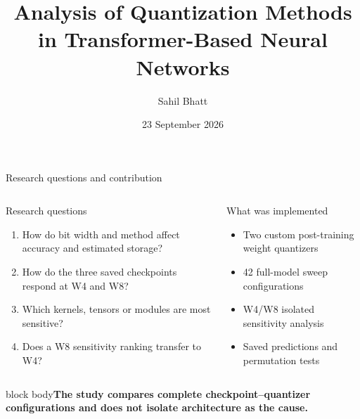 \documentclass[aspectratio=169,10pt]{beamer}
\title[Neural-network quantization]{Analysis of Quantization Methods\\in Transformer-Based Neural Networks}
\author[S. Bhatt]{Sahil Bhatt}
\institute{Technische Universit\"at Ilmenau}
\date{23 September 2026}
\newcommand{\takeaway}[1]{\vfill\begin{beamercolorbox}[wd=\textwidth,sep=1.5mm,rounded=true]{block body}\centering\small\bfseries #1\end{beamercolorbox}}
\begin{document}
\maketitle

\begin{frame}{Research questions and contribution}
\begin{columns}[T,onlytextwidth]
\begin{block}{Research questions}
\small
\begin{enumerate}
  \item How do bit width and method affect accuracy and estimated storage?
  \item How do the three saved checkpoints respond at W4 and W8?
  \item Which kernels, tensors or modules are most sensitive?
  \item Does a W8 sensitivity ranking transfer to W4?
\end{enumerate}
\end{block}
\begin{alertblock}{What was implemented}
\small
\begin{itemize}
  \item Two custom post-training weight quantizers
  \item 42 full-model sweep configurations
  \item W4/W8 isolated sensitivity analysis
  \item Saved predictions and permutation tests
\end{itemize}
\end{alertblock}
\end{columns}
\takeaway{The study compares complete checkpoint--quantizer configurations and does not isolate architecture as the cause.}
\end{frame}
\end{document}
